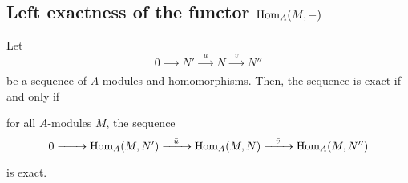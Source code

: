 \subsection{Left exactness of the functor \(\operatorname{Hom}_A(M, -)\)}

\begin{proposition}{}{}
	Let
	\[
		0 \xrightarrow[\quad\quad]{} N' \xrightarrow[\quad\quad]{u}
		N \xrightarrow[\quad\quad]{v} N''
	\]
	be a sequence of \(A\)-modules and homomorphisms.
	Then, the sequence is exact if and only if

	for all \(A\)-modules \(M\), the sequence
	\[
		0 \xrightarrow[\quad\quad]{} \operatorname{Hom}_A(M, N')
		\xrightarrow[\quad\quad]{\bar{u}} \operatorname{Hom}_A(M, N)
		\xrightarrow[\quad\quad]{\bar{v}} \operatorname{Hom}_A(M, N'')
	\]
	is exact.
\end{proposition}

